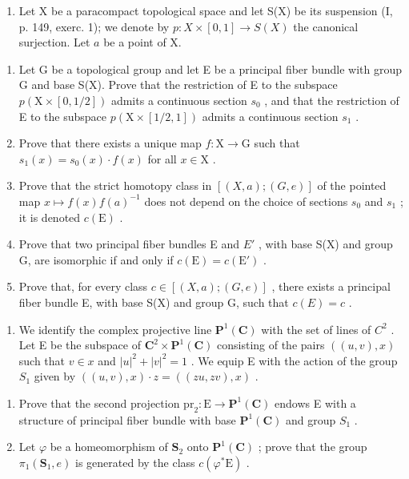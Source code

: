 \begin{enumerate}
\def\labelenumi{\arabic{enumi})}
\setcounter{enumi}{7}
\tightlist
\item
  Let X be a paracompact topological space and let S(X) be its suspension (I, p. 149, exerc. 1); we denote by \(p\colon X \times [0,1] \to S(X)\) the canonical surjection. Let \(a\) be a point of X.
\end{enumerate}

\begin{enumerate}
\def\labelenumi{\alph{enumi})}
\item
  Let G be a topological group and let E be a principal fiber bundle with group G and base S(X). Prove that the restriction of E to the subspace \(p(\mathrm{X} \times [0,1/2])\) admits a continuous section \(s_{0}\) , and that the restriction of E to the subspace \(p(\mathrm{X} \times [1/2,1])\) admits a continuous section \(s_{1}\) .
\item
  Prove that there exists a unique map \(f\colon \mathrm{X}\to \mathrm{G}\) such that \(s_1(x) = s_0(x)\cdot f(x)\) for all \(x\in \mathrm{X}\) .
\item
  Prove that the strict homotopy class in \([(X,a);(G,e)]\) of the pointed map \(x \mapsto f(x)f(a)^{-1}\) does not depend on the choice of sections \(s_{0}\) and \(s_{1}\) ; it is denoted \(c(\mathrm{E})\) .
\item
  Prove that two principal fiber bundles E and \(E'\) , with base S(X) and group G, are isomorphic if and only if \(c(\mathrm{E}) = c(\mathrm{E}')\) .
\item
  Prove that, for every class \(c \in [(X, a); (G, e)]\) , there exists a principal fiber bundle E, with base S(X) and group G, such that \(c(E) = c\) .
\end{enumerate}

\begin{enumerate}
\def\labelenumi{\arabic{enumi})}
\setcounter{enumi}{8}
\tightlist
\item
  We identify the complex projective line \(\mathbf{P}^{1}(\mathbf{C})\) with the set of lines of \(C^{2}\) . Let E be the subspace of \(\mathbf{C}^{2} \times \mathbf{P}^{1}(\mathbf{C})\) consisting of the pairs \(((u, v), x)\) such that \(v \in x\) and \(|u|^{2} + |v|^{2} = 1\) . We equip E with the action of the group \(S_{1}\) given by \(((u, v), x) \cdot z = ((zu, zv), x)\) .
\end{enumerate}

\begin{enumerate}
\def\labelenumi{\alph{enumi})}
\item
  Prove that the second projection \(\mathrm{pr}_{2}\colon\mathrm{E}\to\mathbf{P}^{1}(\mathbf{C})\) endows E with a structure of principal fiber bundle with base \(\mathbf{P}^{1}(\mathbf{C})\) and group \(S_{1}\) .
\item
  Let \(\varphi\) be a homeomorphism of \(\mathbf{S}_2\) onto \(\mathbf{P}^1 (\mathbf{C})\) ; prove that the group \(\pi_1(\mathbf{S}_1,e)\) is generated by the class \(c(\varphi^{*}\mathrm{E})\) .
\end{enumerate}

